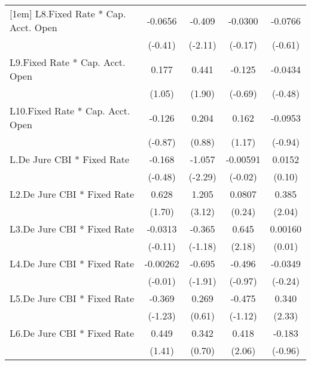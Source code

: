 {\begin{longtable}{l*{4}{c}}
[1em]
L8.Fixed Rate * Cap. Acct. Open&  -0.0656         &   -0.409\sym{*}  &  -0.0300         &  -0.0766         \\
                &  (-0.41)         &  (-2.11)         &  (-0.17)         &  (-0.61)         \\
[1em]
L9.Fixed Rate * Cap. Acct. Open&    0.177         &    0.441         &   -0.125         &  -0.0434         \\
                &   (1.05)         &   (1.90)         &  (-0.69)         &  (-0.48)         \\
[1em]
L10.Fixed Rate * Cap. Acct. Open&   -0.126         &    0.204         &    0.162         &  -0.0953         \\
                &  (-0.87)         &   (0.88)         &   (1.17)         &  (-0.94)         \\
[1em]
L.De Jure CBI * Fixed Rate&   -0.168         &   -1.057\sym{*}  & -0.00591         &   0.0152         \\
                &  (-0.48)         &  (-2.29)         &  (-0.02)         &   (0.10)         \\
[1em]
L2.De Jure CBI * Fixed Rate&    0.628         &    1.205\sym{**} &   0.0807         &    0.385\sym{*}  \\
                &   (1.70)         &   (3.12)         &   (0.24)         &   (2.04)         \\
[1em]
L3.De Jure CBI * Fixed Rate&  -0.0313         &   -0.365         &    0.645\sym{*}  &  0.00160         \\
                &  (-0.11)         &  (-1.18)         &   (2.18)         &   (0.01)         \\
[1em]
L4.De Jure CBI * Fixed Rate& -0.00262         &   -0.695         &   -0.496         &  -0.0349         \\
                &  (-0.01)         &  (-1.91)         &  (-0.97)         &  (-0.24)         \\
[1em]
L5.De Jure CBI * Fixed Rate&   -0.369         &    0.269         &   -0.475         &    0.340\sym{*}  \\
                &  (-1.23)         &   (0.61)         &  (-1.12)         &   (2.33)         \\
[1em]
L6.De Jure CBI * Fixed Rate&    0.449         &    0.342         &    0.418\sym{*}  &   -0.183         \\
                &   (1.41)         &   (0.70)         &   (2.06)         &  (-0.96)         \\
[1em]

\end{longtable}}
